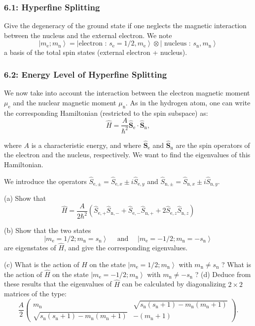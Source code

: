 \documentclass[11pt]{article}
\begin{document}
\subsubsection{6.1: Hyperfine Splitting}
\label{sec:org87b33ff}
Give the degeneracy of the ground state if one neglects the magnetic interaction
between the nucleus and the external electron. We note $$
\left.\left.\left|m_{\mathrm{e}} ; m_{\mathrm{n}}\right\rangle=\mid \text {
electron : } s_{\mathrm{e}}=1 / 2, m_{\mathrm{e}}\right\rangle \otimes \mid
\text { nucleus : } s_{\mathrm{n}}, m_{\mathrm{n}}\right\rangle $$ a basis of
the total spin states (external electron + nucleus).
\subsubsection{6.2: Energy Level of Hyperfine Splitting}
\label{sec:orgf52a3c8}
We now take into account the interaction between the electron magnetic moment
\(\mu_{\mathrm{e}}\) and the nuclear magnetic moment \(\mu_{\mathrm{n}}\). As in the
hydrogen atom, one can write the corresponding Hamiltonian (restricted to the
spin subspace) as: $$ \hat{H}=\frac{A}{\hbar^2}
\hat{\boldsymbol{S}}_{\mathrm{e}} \cdot \hat{\boldsymbol{S}}_{\mathrm{n}}, $$

where \(A\) is a characteristic energy, and where
\(\hat{\boldsymbol{S}}_{\mathrm{e}}\) and \(\hat{\boldsymbol{S}}_{\mathrm{n}}\) are
the spin operators of the electron and the nucleus, respectively. We want to
find the eigenvalues of this Hamiltonian.

We introduce the operators \(\hat{S}_{\mathrm{e}, \pm}=\hat{S}_{\mathrm{e}, x} \pm i
\hat{S}_{\mathrm{e}, y}\) and \(\hat{S}_{\mathrm{n}, \pm}=\hat{S}_{\mathrm{n}, x} \pm
i \hat{S}_{\mathrm{n}, y}\).

(a) Show that $$ \hat{H}=\frac{A}{2 \hbar^2}\left(\hat{S}_{\mathrm{e},+}
\hat{S}_{\mathrm{n},-}+\hat{S}_{\mathrm{e},-} \hat{S}_{\mathrm{n},+}+2
\hat{S}_{\mathrm{e}, z} \hat{S}_{\mathrm{n}, z}\right) $$

(b) Show that the two states $$ \left|m_{\mathrm{e}}=1 / 2 ;
m_{\mathrm{n}}=s_{\mathrm{n}}\right\rangle \quad \text { and } \quad\left|m_{\mathrm{e}}=-1 /
2 ; m_{\mathrm{n}}=-s_{\mathrm{n}}\right\rangle $$ are eigenstates of \(\hat{H}\), and
give the corresponding eigenvalues.

(c) What is the action of \(\hat{H}\) on the state \(\left|m_{\mathrm{e}}=1 / 2 ;
m_{\mathrm{n}}\right\rangle\) with \(m_{\mathrm{n}} \neq s_{\mathrm{n}}\) ? What is the
action of \(\hat{H}\) on the state \(\left|m_{\mathrm{e}}=-1 / 2 ;
m_{\mathrm{n}}\right\rangle\) with \(m_{\mathrm{n}} \neq-s_{\mathrm{n}}\) ? (d) Deduce from
these results that the eigenvalues of \(\hat{H}\) can be calculated by
diagonalizing \(2 \times 2\) matrices of the type: $$
\frac{A}{2}\left(\begin{array}{lr} m_{\mathrm{n}} &
\sqrt{s_{\mathrm{n}}\left(s_{\mathrm{n}}+1\right)-m_{\mathrm{n}}\left(m_{\mathrm{n}}+1\right)}
\\ \sqrt{s_{\mathrm{n}}\left(s_{\mathrm{n}}+1\right)-m_{\mathrm{n}}\left(m_{\mathrm{n}}+1\right)}
& -\left(m_{\mathrm{n}}+1\right) \end{array}\right) . $$
\end{document}
